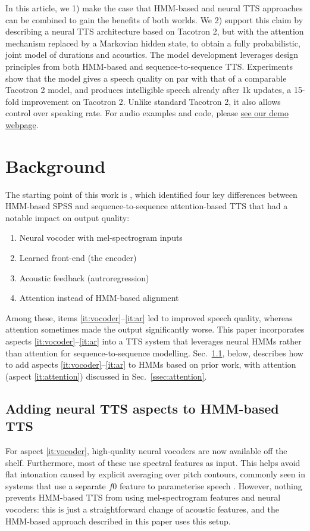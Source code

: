 \documentclass[british]{article}
\newcommand{\webpage}{https://shivammehta007.github.io/Neural-HMM/}
\begin{document}
In this article, we 1) make the case that HMM-based and neural TTS approaches can be combined to gain the benefits of both worlds.
We 2) support this claim by describing a neural TTS architecture based on Tacotron 2, but with the attention mechanism replaced by a Markovian hidden state, to obtain a fully probabilistic, joint model of durations and acoustics.
The model development leverages design principles from both HMM-based and sequence-to-sequence TTS.
Experiments show that the model gives
a speech quality on par with that of a comparable Tacotron 2 model, and produces intelligible speech already after 1k updates, a 15-fold improvement on Tacotron 2.
Unlike standard Tacotron 2, it also allows control over speaking rate.
For audio examples and code, please \href{\webpage}{see our demo webpage}.


\section{Background}
\label{sec:background}
The starting point of this work is \cite{watts2019where}, which identified four key differences between HMM-based SPSS
and sequence-to-sequence attention-based TTS
that had a notable impact on output quality:
\begin{enumerate}
\item \label{it:vocoder} Neural vocoder with mel-spectrogram inputs
\item \label{it:frontend} Learned front-end (the encoder)
\item \label{it:ar} Acoustic feedback (autroregression)
\item \label{it:attention} Attention instead of HMM-based alignment
\end{enumerate}
Among these, items \ref{it:vocoder}--\ref{it:ar} led to improved speech quality, whereas attention
sometimes made the output significantly worse.
This paper incorporates
aspects \ref{it:vocoder}--\ref{it:ar} into a TTS system that leverages neural HMMs \cite{tran2016unsupervised,yu2016online} rather than attention for sequence-to-sequence modelling.
Sec.\ \ref{ssec:upgrading}, below, describes how to add aspects \ref{it:vocoder}--\ref{it:ar} to HMMs based on prior work, with attention (aspect \ref{it:attention}) discussed in Sec.\ \ref{ssec:attention}.

\subsection{Adding neural TTS aspects to HMM-based TTS}
\label{ssec:upgrading}
For aspect \ref{it:vocoder}, high-quality neural vocoders are now available off the shelf.
Furthermore, most of these use spectral features as input.
This helps avoid flat intonation caused by explicit averaging over pitch contours, commonly seen in systems that use a separate $f$0 feature to parameterise speech \cite{watts2019where}.
However, nothing prevents HMM-based TTS from using mel-spectrogram features and neural vocoders: this is just a straightforward change of acoustic features, and the HMM-based approach described in this paper uses this setup.
\end{document}
